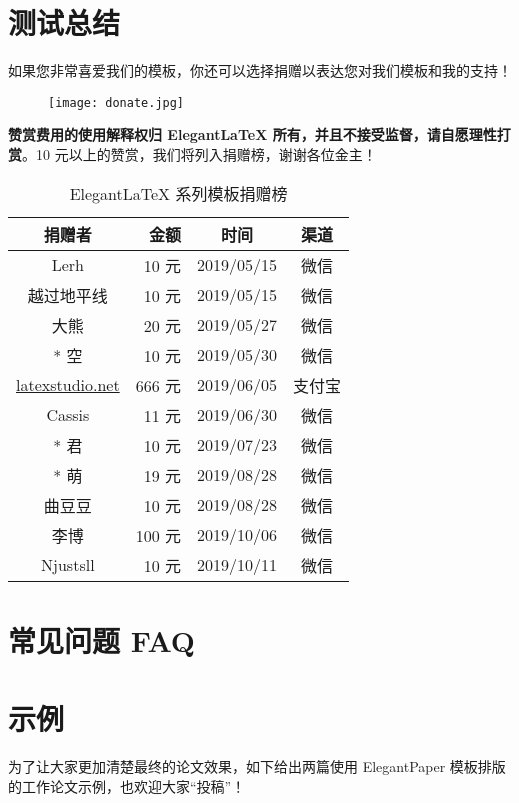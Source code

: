 \documentclass[lang=cn,11pt,a4paper]{elegantpaper}
\begin{document}
\section{测试总结}
如果您非常喜爱我们的模板，你还可以选择捐赠以表达您对我们模板和我的支持！

\begin{figure}[htbp]
  \centering
  \texttt{[image: donate.jpg]}
\end{figure}

\textbf{赞赏费用的使用解释权归 Elegant\LaTeX{} 所有，并且不接受监督，请自愿理性打赏}。10 元以上的赞赏，我们将列入捐赠榜，谢谢各位金主！

\begin{table}[!htbp]
  \centering
  \caption{Elegant\LaTeX{} 系列模板捐赠榜}
  \begin{tabular}{crcc}
    \toprule
    捐赠者   & 金额 & 时间 & 渠道 \\
    \midrule
    Lerh  & 10 元  & 2019/05/15 & 微信 \\
    越过地平线 & 10 元    & 2019/05/15 & 微信 \\
    大熊 &  20 元 & 2019/05/27 & 微信 \\
    * 空 & 10 元 & 2019/05/30 & 微信\\
    \href{http://www.latexstudio.net/}{latexstudio.net} & 666 元 & 2019/06/05 & 支付宝\\
    Cassis & 11 元 & 2019/06/30 & 微信\\
    * 君 & 10 元 & 2019/07/23 & 微信\\
    * 萌 & 19 元 & 2019/08/28 & 微信 \\
    曲豆豆 & 10 元 & 2019/08/28 & 微信 \\
    李博 & 100 元 & 2019/10/06 & 微信\\
    Njustsll & 10 元 & 2019/10/11 & 微信 \\
  \bottomrule
  \end{tabular}%
\end{table}%

\section{常见问题 FAQ}



\section{示例}

为了让大家更加清楚最终的论文效果，如下给出两篇使用 ElegantPaper 模板排版的工作论文示例，也欢迎大家“投稿”！


\end{document}
